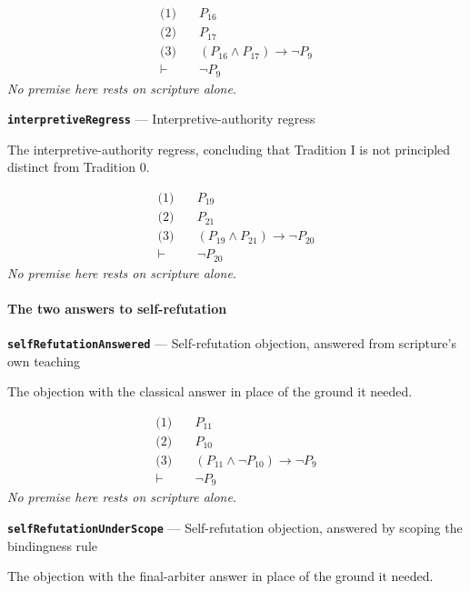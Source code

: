 \documentclass[11pt]{article}
\begin{document}
\begin{align*}
  \text{(1)} \quad & P_{16} \\
  \text{(2)} \quad & P_{17} \\
  \text{(3)} \quad & (P_{16} \land P_{17}) \rightarrow \lnot P_{9} \\
  \vdash \quad & \lnot P_{9}
\end{align*}
\emph{No premise here rests on scripture alone.}
\par\medskip\noindent\textbf{\texttt{interpretive\allowbreak{}Regress}} --- Interpretive-authority regress\par\nobreak\noindent
The interpretive-authority regress, concluding that Tradition I is not principled distinct from Tradition 0.

\begin{align*}
  \text{(1)} \quad & P_{19} \\
  \text{(2)} \quad & P_{21} \\
  \text{(3)} \quad & (P_{19} \land P_{21}) \rightarrow \lnot P_{20} \\
  \vdash \quad & \lnot P_{20}
\end{align*}
\emph{No premise here rests on scripture alone.}
\paragraph*{The two answers to self-refutation}
\leavevmode\par
\par\medskip\noindent\textbf{\texttt{self\allowbreak{}Refutation\allowbreak{}Answered}} --- Self-refutation objection, answered from scripture's own teaching\par\nobreak\noindent
The objection with the classical answer in place of the ground it needed.

\begin{align*}
  \text{(1)} \quad & P_{11} \\
  \text{(2)} \quad & P_{10} \\
  \text{(3)} \quad & (P_{11} \land \lnot P_{10}) \rightarrow \lnot P_{9} \\
  \vdash \quad & \lnot P_{9}
\end{align*}
\emph{No premise here rests on scripture alone.}
\par\medskip\noindent\textbf{\texttt{self\allowbreak{}Refutation\allowbreak{}Under\allowbreak{}Scope}} --- Self-refutation objection, answered by scoping the bindingness rule\par\nobreak\noindent
The objection with the final-arbiter answer in place of the ground it needed.
\end{document}
